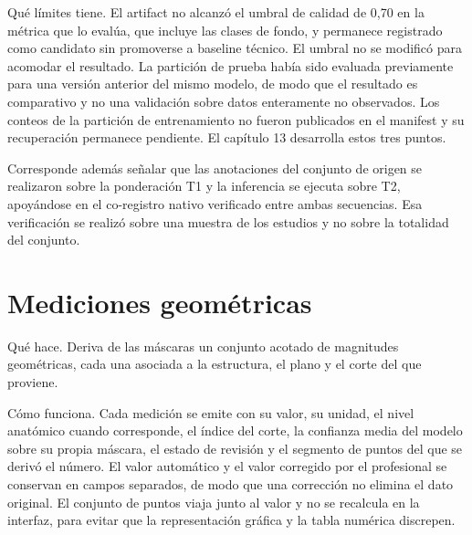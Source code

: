 Qué límites tiene. El artifact no alcanzó el umbral de calidad de 0,70 en la métrica que lo evalúa, que incluye las clases de fondo, y permanece registrado como candidato sin promoverse a baseline técnico. El umbral no se modificó para acomodar el resultado. La partición de prueba había sido evaluada previamente para una versión anterior del mismo modelo, de modo que el resultado es comparativo y no una validación sobre datos enteramente no observados. Los conteos de la partición de entrenamiento no fueron publicados en el manifest y su recuperación permanece pendiente. El capítulo 13 desarrolla estos tres puntos.

Corresponde además señalar que las anotaciones del conjunto de origen se realizaron sobre la ponderación T1 y la inferencia se ejecuta sobre T2, apoyándose en el co-registro nativo verificado entre ambas secuencias. Esa verificación se realizó sobre una muestra de los estudios y no sobre la totalidad del conjunto.

\section{Mediciones geométricas}

Qué hace. Deriva de las máscaras un conjunto acotado de magnitudes geométricas, cada una asociada a la estructura, el plano y el corte del que proviene.

Cómo funciona. Cada medición se emite con su valor, su unidad, el nivel anatómico cuando corresponde, el índice del corte, la confianza media del modelo sobre su propia máscara, el estado de revisión y el segmento de puntos del que se derivó el número. El valor automático y el valor corregido por el profesional se conservan en campos separados, de modo que una corrección no elimina el dato original. El conjunto de puntos viaja junto al valor y no se recalcula en la interfaz, para evitar que la representación gráfica y la tabla numérica discrepen.

